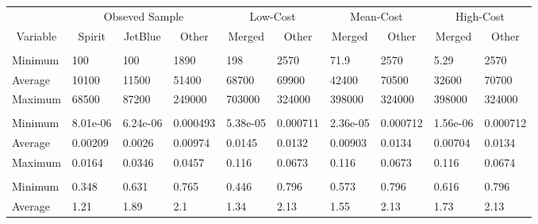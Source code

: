 
\begin{tabular}[t]{llllllllll}
\toprule
\multicolumn{1}{c}{ } & \multicolumn{3}{c}{Obseved Sample} & \multicolumn{2}{c}{Low-Cost} & \multicolumn{2}{c}{Mean-Cost} & \multicolumn{2}{c}{High-Cost} \\
\cmidrule(l{3pt}r{3pt}){2-4} \cmidrule(l{3pt}r{3pt}){5-6} \cmidrule(l{3pt}r{3pt}){7-8} \cmidrule(l{3pt}r{3pt}){9-10}
\multicolumn{1}{c}{Variable} & \multicolumn{1}{c}{Spirit} & \multicolumn{1}{c}{JetBlue} & \multicolumn{1}{c}{Other} & \multicolumn{1}{c}{Merged} & \multicolumn{1}{c}{Other} & \multicolumn{1}{c}{Merged} & \multicolumn{1}{c}{Other} & \multicolumn{1}{c}{Merged} & \multicolumn{1}{c}{Other} \\
\cmidrule(l{3pt}r{3pt}){1-1} \cmidrule(l{3pt}r{3pt}){2-2} \cmidrule(l{3pt}r{3pt}){3-3} \cmidrule(l{3pt}r{3pt}){4-4} \cmidrule(l{3pt}r{3pt}){5-5} \cmidrule(l{3pt}r{3pt}){6-6} \cmidrule(l{3pt}r{3pt}){7-7} \cmidrule(l{3pt}r{3pt}){8-8} \cmidrule(l{3pt}r{3pt}){9-9} \cmidrule(l{3pt}r{3pt}){10-10}
\addlinespace[0.3em]
\multicolumn{10}{l}{\textbf{Passengers}}\\
\hspace{1em}Minimum & 100 & 100 & 1890 & 198 & 2570 & 71.9 & 2570 & 5.29 & 2570\\
\hspace{1em}Average & 10100 & 11500 & 51400 & 68700 & 69900 & 42400 & 70500 & 32600 & 70700\\
\hspace{1em}Maximum & 68500 & 87200 & 249000 & 703000 & 324000 & 398000 & 324000 & 398000 & 324000\\
\addlinespace[0.3em]
\multicolumn{10}{l}{\textbf{Market Share}}\\
\hspace{1em}Minimum & 8.01e-06 & 6.24e-06 & 0.000493 & 5.38e-05 & 0.000711 & 2.36e-05 & 0.000712 & 1.56e-06 & 0.000712\\
\hspace{1em}Average & 0.00209 & 0.0026 & 0.00974 & 0.0145 & 0.0132 & 0.00903 & 0.0134 & 0.00704 & 0.0134\\
\hspace{1em}Maximum & 0.0164 & 0.0346 & 0.0457 & 0.116 & 0.0673 & 0.116 & 0.0673 & 0.116 & 0.0674\\
\addlinespace[0.3em]
\multicolumn{10}{l}{\textbf{Prices}}\\
\hspace{1em}Minimum & 0.348 & 0.631 & 0.765 & 0.446 & 0.796 & 0.573 & 0.796 & 0.616 & 0.796\\
\hspace{1em}Average & 1.21 & 1.89 & 2.1 & 1.34 & 2.13 & 1.55 & 2.13 & 1.73 & 2.13\\

\end{tabular}
